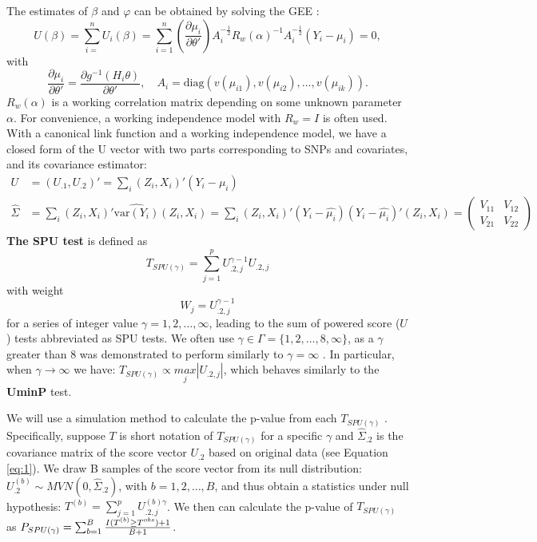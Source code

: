 \documentclass[12pt]{article}
\begin{document}
The estimates of $\beta$ and $\varphi$ can be obtained by solving the GEE \cite{liang1986longitudinal}: 
$$
U(\beta) =\sum_{i=}^{n}U_{i}(\beta)=\sum_{i=1}^{n}(\frac{\partial\mu_{i}}{\partial\theta'})A_{i}^{-\frac{1}{2}}R_{w}(\alpha)^{-1}A_{i}^{-\frac{1}{2}}(Y_{i}-\mu_{i})=0,
$$
with
$$
\frac{\partial\mu_{i}}{\partial\theta'} =\frac{\partial g^{-1}(H_{i}\theta)}{\partial\theta'}, \quad
A_{i}=\textrm{diag} \left( v(\mu_{i1}),v(\mu_{i2}),\ldots,v(\mu_{ik}) \right).
$$
$R_w(\alpha)$ is a working correlation matrix depending on some unknown
parameter $\alpha$. For convenience, a working independence model
with $R_w = I$ is often used. With a canonical link function and a working independence model, we have a closed form of the U vector with two parts corresponding to SNPs and covariates, and its covariance estimator:
\begin{align}
U & =\left(U_{.1},U_{.2}\right)'=\sum_{i}\left(Z_{i},X_{i}\right)'(Y_{i}-\mu_{i})\nonumber \\
\hat{\Sigma} & =\sum_{i}\left(Z_{i},X_{i}\right)'\hat{\textrm{var}(Y_{i})}\left(Z_{i},X_{i}\right)=\sum_{i}\left(Z_{i},X_{i}\right)'(Y_{i}-\hat{\mu_{i}})(Y_{i}-\hat{\mu_{i}})'\left(Z_{i},X_{i}\right)=\begin{pmatrix}V_{11} & V_{12}\\
V_{21} & V_{22}
\end{pmatrix}\label{eq:1}
\end{align}
\textbf{The SPU test }is defined as
$$
T_{ SPU ( \gamma ) } = \sum_{j=1}^p U_{.2, j} ^ { \gamma - 1} U_{.2, j}
$$
with weight 
$$W_j = U_{.2, j} ^ { \gamma - 1} $$
for a series of integer value $\gamma = 1,2,\ldots,\infty$, leading to the sum of powered score ($U$) tests abbreviated as SPU tests. %
We often use $\gamma\in\Gamma=\{1,2,\dots,8,\infty\}$, as a $\gamma$
greater than 8 was demonstrated to perform similarly to $\gamma = \infty$ \cite{pan2014powerful}.
In particular, when $\gamma\rightarrow\infty$ we have: $T_{SPU(\gamma)}\propto\underset{j}{max}|U_{.2,j}|$,
which behaves similarly to the \textbf{UminP} test.

We will use a simulation method to calculate the p-value from each $T_{ SPU(\gamma) }$ \cite{Lin2005,Seaman2005}. Specifically, suppose $T$ is short notation of $T_{ SPU(\gamma) }$ for a specific $\gamma$ and $\hat{\Sigma}_{.2}$ is the covariance matrix of the score vector $U_{.2}$ based on original data (see Equation \ref{eq:1}). We draw B samples of the score vector from its null distribution: $U_{.2}^{ (b) } \sim MVN \left( 0, \hat{\Sigma}_{.2} \right)$, with $b = 1,2,\ldots,B$, and thus obtain a statistics under null hypothesis: $T ^ {(b)} = \sum_{j=1}^p U^{ (b)\gamma }_{.2, j} $. We then can calculate the p-value of $T_{ SPU(\gamma) }$ as $P_{ SPU(\gamma) } = \sum_{b=1}^B { I(T^{(b)} \geq T ^ {obs} ) + 1  \over B + 1 } $.
\end{document}
